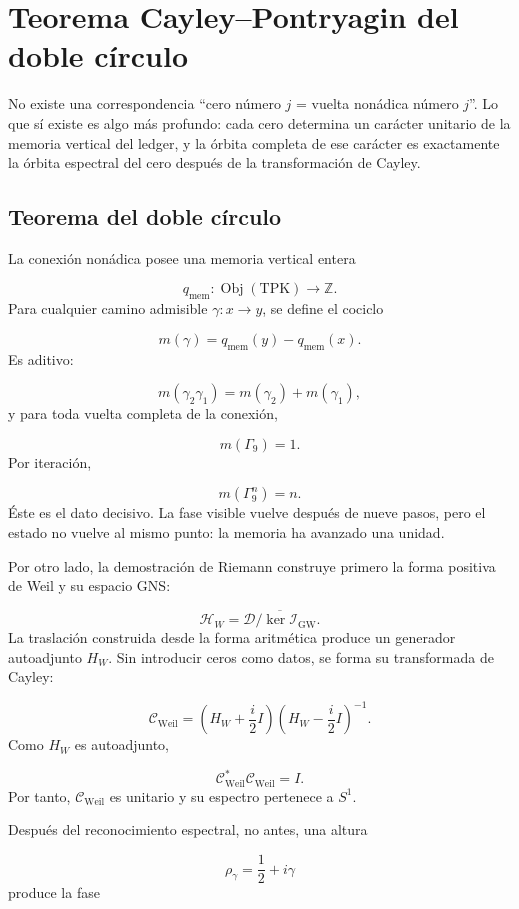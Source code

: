 \section{Teorema Cayley–Pontryagin del doble círculo}
No existe una correspondencia “cero número \(j\) = vuelta nonádica número \(j\)”. Lo que sí existe es algo más profundo: cada cero determina un carácter unitario de la memoria vertical del ledger, y la órbita completa de ese carácter es exactamente la órbita espectral del cero después de la transformación de Cayley.\par
{}
\subsection{Teorema del doble círculo}
La conexión nonádica posee una memoria vertical entera\par
\[
q_{\mathrm{mem}}:\operatorname{Obj}(\mathrm{TPK})\longrightarrow\mathbb Z.
\]
Para cualquier camino admisible \(\gamma:x\to y\), se define el cociclo\par
\[
m(\gamma)
=
q_{\mathrm{mem}}(y)-q_{\mathrm{mem}}(x).
\]
Es aditivo:\par
\[
m(\gamma_2\gamma_1)
=
m(\gamma_2)+m(\gamma_1),
\]
y para toda vuelta completa de la conexión,\par
\[
m(\Gamma_9)=1.
\]
Por iteración,\par
\[
m(\Gamma_9^n)=n.
\]
Éste es el dato decisivo. La fase visible vuelve después de nueve pasos, pero el estado no vuelve al mismo punto: la memoria ha avanzado una unidad.\par
Por otro lado, la demostración de Riemann construye primero la forma positiva de Weil y su espacio GNS:\par
\[
\mathcal H_W
=
\overline{\mathcal D/\ker \mathscr I_{\mathrm{GW}}}.
\]
La traslación construida desde la forma aritmética produce un generador autoadjunto \(H_W\). Sin introducir ceros como datos, se forma su transformada de Cayley:\par
\[
\mathcal C_{\mathrm{Weil}}
=
\left(H_W+\frac{i}{2}I\right)
\left(H_W-\frac{i}{2}I\right)^{-1}.
\]
Como \(H_W\) es autoadjunto,\par
\[
\mathcal C_{\mathrm{Weil}}^*
\mathcal C_{\mathrm{Weil}}=I.
\]
Por tanto, \(\mathcal C_{\mathrm{Weil}}\) es unitario y su espectro pertenece a \(S^1\).\par
Después del reconocimiento espectral, no antes, una altura\par
\[
\rho_\gamma=\frac12+i\gamma
\]
produce la fase\par
